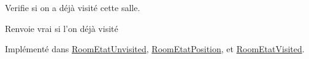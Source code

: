 Verifie si on a déjà visité cette salle. 

\begin{DoxyReturn}{Renvoie}
vrai si l'on déjà visité 
\end{DoxyReturn}


Implémenté dans \hyperlink{class_room_etat_unvisited_aece46ff49588ac0e191cc5f7af6860d9}{Room\-Etat\-Unvisited}, \hyperlink{class_room_etat_position_aab1a503a6852677591c061c06513a5a8}{Room\-Etat\-Position}, et \hyperlink{class_room_etat_visited_a7d8f9d29a61c766c879aeff49cd391cc}{Room\-Etat\-Visited}.

